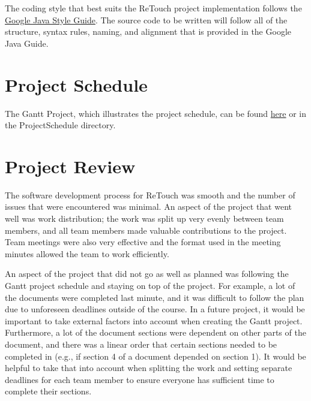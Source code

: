 \documentclass{article}
\begin{document}
    The coding style that best suits the ReTouch project implementation follows the \href{https://google.github.io/styleguide/javaguide.html}{Google Java Style Guide}. The source code to be written will follow all of the structure, syntax rules, naming, and alignment that is provided in the Google Java Guide. 

\section{Project Schedule}

    The Gantt Project, which illustrates the project schedule, can be found \href{run:../../ProjectSchedule/Gantt_Project.gan}{here} or in the ProjectSchedule directory. 
\section{Project Review}
    \color{cyan} The software development process for ReTouch was smooth and the number of issues that were encountered was minimal. An aspect of the project that went well was work distribution; the work was split up very evenly between team members, and all team members made valuable contributions to the project. Team meetings were also very effective and the format used in the meeting minutes allowed the team to work efficiently.
    
    An aspect of the project that did not go as well as planned was following the Gantt project schedule and staying on top of the project. For example, a lot of the documents were completed last minute, and it was difficult to follow the plan due to unforeseen deadlines outside of the course. In a future project, it would be important to take external factors into account when creating the Gantt project. Furthermore, a lot of the document sections were dependent on other parts of the document, and there was a linear order that certain sections needed to be completed in (e.g., if section 4 of a document depended on section 1). It would be helpful to take that into account when splitting the work and setting separate deadlines for each team member to ensure everyone has sufficient time to complete their sections.
\end{document}
